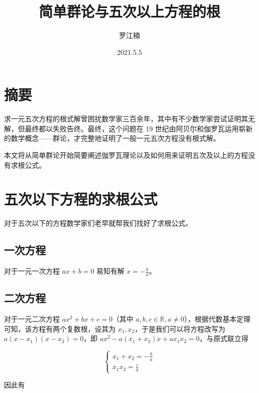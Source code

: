 \documentclass[hyperref,UTF8,12pt,a4paper]{ctexart}
\title{简单群论与五次以上方程的根}
\author{罗江楠}
\date{2021.5.5}
\begin{document}
\maketitle



\newpage

\section{摘要}


求一元五次方程的根式解曾困扰数学家三百余年，其中有不少数学家尝试证明其无解，但最终都以失败告终。最终，这个问题在 19 世纪由阿贝尔和伽罗瓦运用崭新的数学概念——群论，才完整地证明了一般一元五次方程没有根式解。

本文将从简单群论开始简要阐述伽罗瓦理论以及如何用来证明五次及以上的方程没有求根公式。

\newpage

\section{五次以下方程的求根公式}

对于五次以下的方程数学家们老早就帮我们找好了求根公式。

\subsection{一次方程}

对于一元一次方程 $ax+b=0$ 易知有解 $x=-\frac ba$。

\subsection{二次方程}

对于一元二次方程 $ax^2+bx+c=0$（其中 $a,b,c\in\mathbb R,a\neq 0$），根据代数基本定理可知，该方程有两个复数根，设其为 $x_1,x_2$，于是我们可以将方程改写为 $a(x-x_1)(x-x_2)=0$，即 $ax^2-a(x_1+x_2)x+ax_1x_2=0$，与原式联立得

$$
\begin{cases}
x_1+x_2=-\frac ba \\
x_1x_2=\frac ca
\end{cases}
$$

因此有
\end{document}
